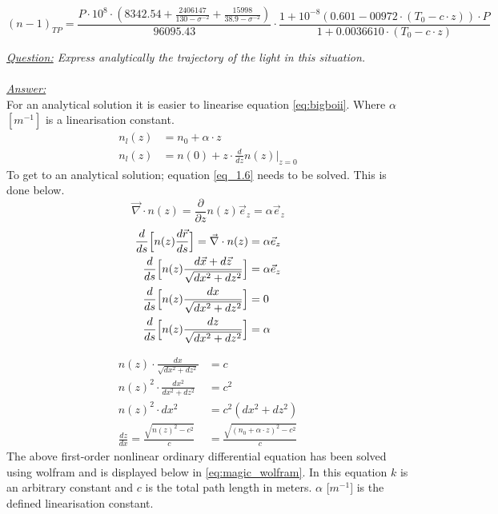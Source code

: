 \documentclass{article}
\begin{document}
\begin{equation}
	(n-1)_{TP} = \frac{P\cdot 10^8 \cdot (8342.54 + \frac{2406147}{130-\sigma^{-2}}+\frac{15998}{38.9-\sigma^{-2}})}{96095.43}\cdot \frac{1+10^{-8}(0.601-00972\cdot (T_0 - c \cdot z))\cdot P}{1+0.0036610\cdot (T_0 - c \cdot z)}
	\label{eq:bigboii}
\end{equation}


\textit{\underline{Question:} Express analytically the trajectory of the light in this situation.}\\
\\
\textit{\underline{Answer:}} \\
For an analytical solution it is easier to linearise equation \ref{eq:bigboii}. Where $\alpha$ $[m^{-1}]$ is a linearisation constant.
\begin{align*}
	n_l(z) &= n_0 + \alpha \cdot z\\
	n_l(z) &= n(0) +z \cdot \frac{d}{dz}n(z)\rvert_{z=0}
\end{align*}
To get to an analytical solution; equation \ref{eq_1.6} needs to be solved. This is done below.
\begin{equation*}
	\vec{\nabla} \cdot n(z) = \frac{\partial}{\partial z}n(z) \vec{e}_z = \alpha \vec{e}_z
\end{equation*}
\begin{align*}
	\frac{d}{ds} \Bigl[n(z)\frac{d\vec{r}}{ds}\Bigr] = \vec{\nabla}\cdot n(z) &= \alpha \vec{e}_z\\
	\frac{d}{ds} \Bigl[n(z)\frac{d\vec{x}+d\vec{z}}{\sqrt{dx^2 + dz^2}}\Bigr] &= \alpha \vec{e}_z\\
	\frac{d}{ds} \Bigl[n(z)\frac{dx}{\sqrt{dx^2 + dz^2}}\Bigr] &= 0\\
	\frac{d}{ds} \Bigl[n(z)\frac{dz}{\sqrt{dx^2 + dz^2}}\Bigr] &= \alpha\\
\end{align*}

\begin{align*}
	n(z)\cdot \frac{dx}{\sqrt{dx^2 + dz^2}} &= c\\
	n(z)^2 \cdot \frac{dx^2}{dx^2 + dz^2} &= c^2\\
	n(z)^2 \cdot dx^2 &= c^2(dx^2 + dz^2)\\
	\frac{dz}{dx} = \frac{\sqrt{n(z)^2 -c^2}}{c} &= \frac{\sqrt{(n_0+\alpha\cdot z)^2 -c^2}}{c}
\end{align*}
The above first-order nonlinear ordinary differential equation has been solved using wolfram and is displayed below in \ref{eq:magic_wolfram}. In this equation $k$ is an arbitrary constant and $c$ is the total path length in meters. $\alpha$ [$m^{-1}$] is the defined linearisation constant.
\end{document}
